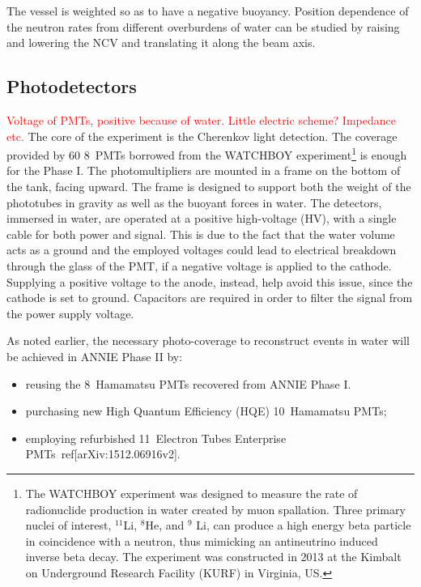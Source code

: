  The vessel is weighted so as to have a negative buoyancy.
 Position dependence of the neutron rates from different overburdens of water can be %
 studied by raising and lowering the NCV and translating it along the beam axis.

\subsection{Photodetectors}
\label{sec:pmt}
\textcolor{red}{Voltage of PMTs, positive because of water. Little electric scheme? Impedance etc.}
 The core of the experiment is the Cherenkov light detection.
 The coverage provided by 60 8\inch~PMTs borrowed from the WATCHBOY experiment\footnote{The %
   WATCHBOY experiment was designed to measure the rate of radionuclide production in water %
   created by muon spallation. Three primary nuclei of interest, $^{11}$Li, $^8$He, and %
   $^9$ Li, can produce a high energy beta particle in coincidence with a neutron, thus mimicking %
   an antineutrino induced inverse beta decay. The experiment was constructed in 2013 at the %
   Kimbalt on Underground Research Facility (KURF) in Virginia, US.} is enough %
   for the Phase I.
 The photomultipliers are mounted in a frame on the bottom of the tank, facing upward.
 The frame is designed to support both the weight of the phototubes in gravity as well as the %
 buoyant forces in water. 
 The detectors, immersed in water, are operated at a positive high-voltage (HV), with a single %
 cable for both power and signal.
 This is due to the fact that the water volume acts as a ground and the employed voltages could lead to electrical %
 breakdown through the glass of the PMT, if a negative voltage is applied to the cathode.
 Supplying a positive voltage to the anode, instead, help avoid this issue, since the cathode is set to ground.
 Capacitors are required in order to filter the signal from the power supply voltage.

 As noted earlier, the necessary photo-coverage to reconstruct events in water %
 will be achieved in ANNIE Phase II by:
 \begin{itemize}
   \item reusing the 8\inch~Hamamatsu PMTs recovered from ANNIE Phase I.
   \item purchasing new High Quantum Efficiency (HQE) 10\inch~Hamamatsu PMTs;
   \item employing refurbished 11\inch~Electron Tubes Enterprise PMTs~ref[arXiv:1512.06916v2].
 \end{itemize}
 
